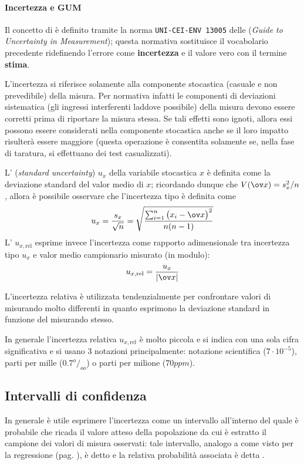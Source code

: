 	\paragraph{Incertezza  e GUM} Il concetto di  è definito tramite la norma \texttt{UNI-CEI-ENV 13005} delle  (\textit{Guide to Uncertainty in Measurement}); questa normativa sostituisce il vocabolario precedente ridefinendo l'errore come \textbf{incertezza} e il valore vero con il termine \textbf{stima}.
	
	L'incertezza si riferisce solamente alla componente stocastica (casuale e non prevedibile) della misura. Per normativa infatti le componenti di deviazioni sistematica (gli ingressi interferenti laddove possibile) della misura devono essere corretti prima di riportare la misura stessa. Se tali effetti sono ignoti, allora essi possono essere considerati nella componente stocastica anche se il loro impatto risulterà essere maggiore (questa operazione è consentita solamente se, nella fase di taratura, si effettuano dei test casualizzati).
	
	L' (\textit{standard uncertainty}) $u_x$ della variabile stocastica $x$ è definita come la deviazione standard del valor medio di $x$; ricordando dunque che $V(\ov x) = s_x^2/n$, allora è possibile osservare che l'incertezza tipo è definita come
	\begin{equation}
		u_x = \frac{s_x}{\sqrt n} = \sqrt{ \frac{\sum_{i=1}^n \big(x_i-\ov x\big)^2}{n(n-1)}}
	\end{equation}
	L' $u_{x,\textrm{rel}}$ esprime invece l'incertezza come rapporto adimensionale tra incertezza tipo $u_x$ e valor medio campionario misurato (in modulo):
	\begin{equation}
		u_{x,\textrm{rel}} = \frac{u_x}{|\ov x|}
	\end{equation}
	\begin{nota}
		L'incertezza relativa è utilizzata tendenzialmente per confrontare valori di misurando molto differenti in quanto esprimono la deviazione standard in funzione del misurando stesso.
	\end{nota}
	In generale l'incertezza relativa $u_{x,\textrm{rel}}$ è molto piccola e si indica con una sola cifra significativa e si usano 3 notazioni principalmente: notazione scientifica ($7\cdot 10^{-5}$), parti per mille ($0.7 ^o/_{oo}$) o parti per milione ($70ppm$).
	
	\subsection{Intervalli di confidenza}
		In generale è utile esprimere l'incertezza come un intervallo all'interno del quale è probabile che ricada il valore atteso della popolazione da cui è estratto il campione dei valori di misura osservati: tale intervallo, analogo a come visto per la regressione (pag. \pageref{sec:stat:regrpred}), è detto  e la relativa probabilità associata è detta .
		
